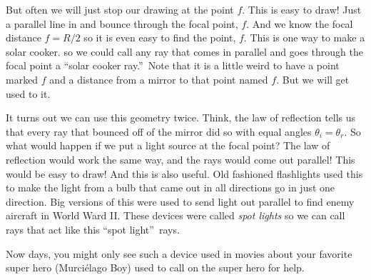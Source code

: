 \documentclass{article}
\begin{document}
But often we will just stop our
drawing at the point $f.$ This is easy to draw! Just a parallel line in and
bounce through the focal point, $f$. And we know the focal distance $f=R/2$
so it is even easy to find the point, $f.$ This is one way to make a solar
cooker. so we could call any ray that
comes in parallel and goes through the focal point a \textquotedblleft solar
cooker ray.\textquotedblright\ Note that it is a little weird to have a
point marked $f$ and a distance from a mirror to that point named $f.$ But
we will get used to it.

It turns out we can use this geometry twice. Think, the law of reflection
tells us that every ray that bounced off of the mirror did so with equal
angles $\theta _{i}=\theta _{r}.$ So what would happen if we put a light
source at the focal point? The law of reflection would work the same way,
and the rays would come out parallel! This would be easy to draw! And
this is also useful. Old fashioned flashlights used this to make the light
from a bulb that came out in all directions go in just one direction. Big
versions of this were used to send light out parallel to find enemy aircraft
in World Ward II. These devices were called \emph{spot lights} so we can
call rays that act like this \textquotedblleft spot light\textquotedblright\
rays.

Now days, you might only see such
a device used in movies about your favorite super hero (Murci\'{e}lago Boy)
used to call on the super hero for help.
\end{document}
